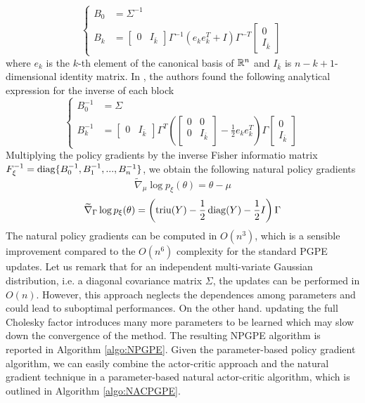 \begin{equation*}
	\begin{cases}
		B_0 &= \Sigma^{-1}\\	
		B_k &= \begin{bmatrix}
				0 & I_{\bar{k}}
		\end{bmatrix} \Gamma^{-1} (e_k e_k^T + I) \Gamma^{-T} \begin{bmatrix}
						0 \\ I_{\bar{k}}
				\end{bmatrix}
	\end{cases}
\end{equation*}
where $e_k$ is the $k$-th element of the canonical basis of $\mathbb{R}^n$ and $I_{\bar{k}}$ is $n - k + 1$-dimensional identity matrix. In \cite{akimoto2010bidirectional}, the authors found the following analytical expression for the inverse of each block
\begin{equation*}
	\begin{cases}
		B_0^{-1} &= \Sigma\\	
		B_k^{-1} &= \begin{bmatrix}
				0 & I_{\bar{k}}
		\end{bmatrix} \Gamma^T \left(\begin{bmatrix}
			0 & 0 \\
			0 & I_{\bar{k}}\\
		\end{bmatrix}   -\frac{1}{2} e_k e_k^T\right) \Gamma \begin{bmatrix}
						0 \\ I_{\bar{k}}
				\end{bmatrix}
	\end{cases}
\end{equation*}
Multiplying the policy gradients by the inverse Fisher informatio matrix $F_\xi^{-1} = \operatorname{diag}\{B_0^{-1}, B_1^{-1}, ..., B_n^{-1}\}$, we obtain the following natural policy gradients
\begin{equation}
	\widetilde{\nabla}_\mu \log p_\xi(\theta) = \theta - \mu
\end{equation}
\begin{equation}
	\widetilde{\nabla}_\Gamma \log p_\xi(\theta) = \left(\operatorname{triu}(Y) - \frac{1}{2} \operatorname{diag}(Y) - \frac{1}{2} I \right) \Gamma
\end{equation}
The natural policy gradients can be computed in $O(n^3)$, which is a sensible improvement compared to the $O(n^6)$ complexity for the standard PGPE updates. Let us remark that for an independent multi-variate Gaussian distribution, i.e. a diagonal covariance matrix $\Sigma$, the updates can be performed in $O(n)$. However, this approach neglects the dependences among parameters and could lead to suboptimal performances. On the other hand. updating the full Cholesky factor introduces many more parameters to be learned which may slow down the convergence of the method. The resulting NPGPE algorithm is reported in Algorithm \ref{algo:NPGPE}. Given the parameter-based policy gradient algorithm, we can easily combine the actor-critic approach and the natural gradient technique in a parameter-based natural actor-critic algorithm, which is outlined in Algorithm \ref{algo:NACPGPE}.
